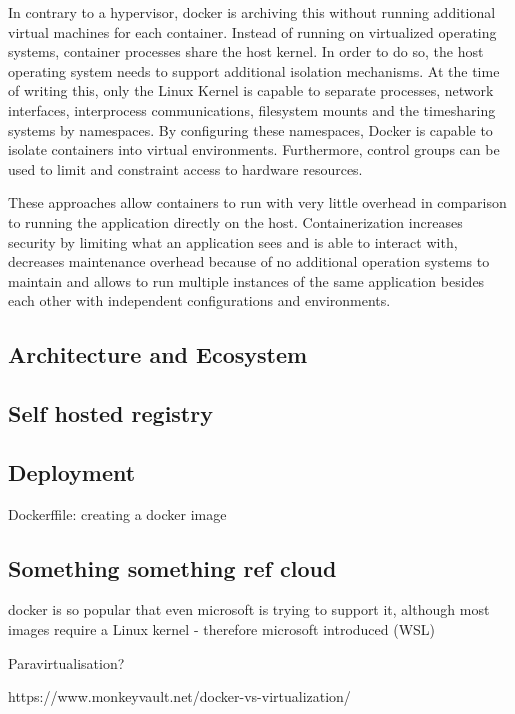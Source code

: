 In contrary to a hypervisor, docker is archiving this without running additional virtual machines for each container.
Instead of running on virtualized operating systems, container processes share the host kernel.
In order to do so, the host operating system needs to support additional isolation mechanisms.
At the time of writing this, only the Linux Kernel is capable to separate processes, network interfaces, interprocess communications, filesystem mounts and the timesharing systems by namespaces.
By configuring these namespaces, Docker is capable to isolate containers into virtual environments.
Furthermore, control groups can be used to limit and constraint access to hardware resources.
\cite{docker:overview}

These approaches allow containers to run with very little overhead in comparison to running the application directly on the host.
Containerization increases security by limiting what an application sees and is able to interact with, decreases maintenance overhead because of no additional operation systems to maintain and allows to run multiple instances of the same application besides each other with independent configurations and environments.

\subsection{Architecture and Ecosystem}
\label{docker:ecosystem} 

\subsection{Self hosted registry}

\subsection{Deployment}

Dockerffile: creating a docker image

\subsection{Something something ref cloud }

docker is so popular that even microsoft is trying to support it, although most images require a Linux kernel - therefore microsoft introduced (WSL)

Paravirtualisation?

https://www.monkeyvault.net/docker-vs-virtualization/

